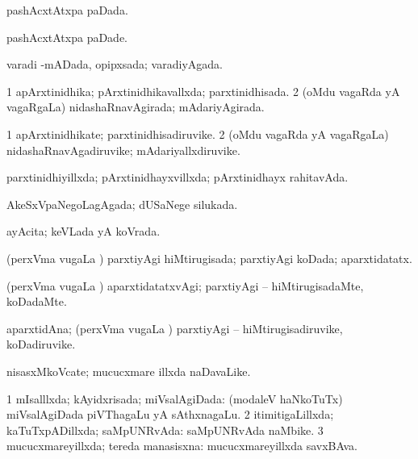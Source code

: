 {{\bentry
{} 
\gl{\gu}
\expl{}
\bmng
pashAcxtAtxpa paDada. 
\emng
\eentry

\bentry
{} 
\gl{\kirxvi}
\expl{}
\bmng
pashAcxtAtxpa paDade. 
\emng
\eentry

\bentry
{} 
\gl{\gu}
\expl{}
\bmng
varadi -mADada, opipxsada; varadiyAgada. 
\emng
\eentry

\bentry
{} 
\gl{\gu}
\expl{}
\bmng
\bnum
\num{1} apArxtinidhika; pArxtinidhikavallxda; parxtinidhisada. 
\num{2} (oMdu vagaRda yA vagaRgaLa) nidashaRnavAgirada; mAdariyAgirada. 
\enum
\emng
\eentry

\bentry
{} 
\gl{\nA}
\expl{}
\bmng
\bnum
\num{1} apArxtinidhikate; parxtinidhisadiruvike. 
\num{2} (oMdu vagaRda yA vagaRgaLa) nidashaRnavAgadiruvike; mAdariyallxdiruvike. 
\enum
\emng
\eentry

\bentry
{} 
\gl{\gu}
\expl{}
\bmng
parxtinidhiyillxda; pArxtinidhayxvillxda; pArxtinidhayx rahitavAda. 
\emng
\eentry

\bentry
{} 
\gl{\gu}
\expl{}
\bmng
AkeSxVpaNegoLagAgada; dUSaNege silukada. 
\emng
\eentry

\bentry
{} 
\gl{\gu}
\expl{}
\bmng
ayAcita; keVLada yA koVrada. 
\emng
\eentry

\bentry
{} 
\gl{\gu}
\expl{}
\bmng
(perxVma \mo vugaLa \vi) parxtiyAgi hiMtirugisada; parxtiyAgi koDada; aparxtidatatx. 
\emng
\eentry

\bentry
{} 
\gl{\kirxvi}
\expl{}
\bmng
(perxVma \mo vugaLa \vi) aparxtidatatxvAgi; parxtiyAgi -- hiMtirugisadaMte, koDadaMte. 
\emng
\eentry

\bentry
{} 
\gl{\nA}
\expl{}
\bmng
aparxtidAna; (perxVma \mo vugaLa \vi) parxtiyAgi -- hiMtirugisadiruvike, koDadiruvike. 
\emng
\eentry

\bentry
{} 
\gl{\nA}
\expl{}
\bmng
nisasxMkoVcate; mucucxmare illxda naDavaLike. 
\emng
\eentry

\bentry
{} 
\gl{\gu}
\expl{}
\bmng
\bnum
\num{1} mIsalllxda; kAyidxrisada; miVsalAgiDada:  (modaleV haNkoTuTx) miVsalAgiDada piVThagaLu yA sAthxnagaLu. 
\num{2} itimitigaLillxda; kaTuTxpADillxda; saMpUNRvAda:  saMpUNRvAda naMbike. 
\num{3} mucucxmareyillxda; tereda manasisxna:  mucucxmareyillxda savxBAva. 
\enum
\emng
\eentry

}}
